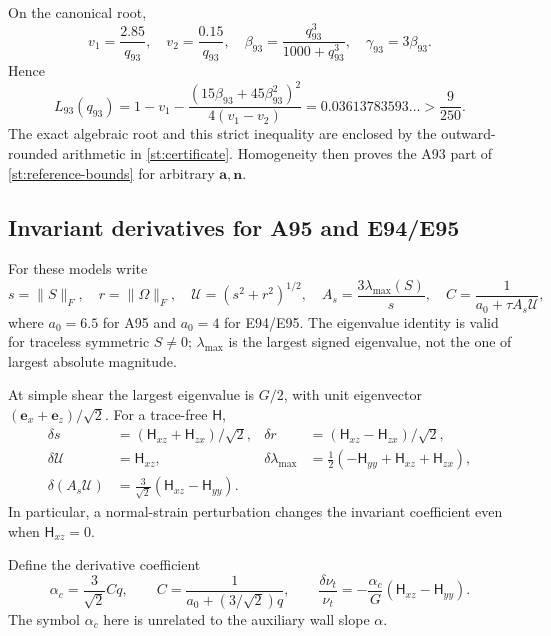 \documentclass[11pt,a4paper]{article}
\numberwithin{equation}{section}
\newcommand{\nut}{\nu_t}
\begin{document}
On the canonical root,
\[
 v_1=\frac{2.85}{q_{93}},\quad v_2=\frac{0.15}{q_{93}},\quad
 \beta_{93}=\frac{q_{93}^3}{1000+q_{93}^3},\quad
 \gamma_{93}=3\beta_{93}.
\]
Hence
\begin{equation}
 L_{93}(q_{93})
 =1-v_1-\frac{(15\beta_{93}+45\beta_{93}^2)^2}
                    {4(v_1-v_2)}
 =0.03613783593\ldots>\frac9{250}.
 \label{st:a93-reference-bound}
\end{equation}
The exact algebraic root and this strict inequality are enclosed by
the outward-rounded arithmetic in \cref{st:certificate}. Homogeneity
then proves the A93 part of \cref{st:reference-bounds} for arbitrary
$\boldsymbol a,\boldsymbol n$.

\subsection{Invariant derivatives for A95 and E94/E95}
\label{st:invariant-derivatives}

For these models write
\[
 s=\|S\|_F,\quad r=\|\Omega\|_F,\quad
 \mathcal U=(s^2+r^2)^{1/2},\quad
 A_s=\frac{3\lambda_{\max}(S)}s,\quad
 C=\frac1{a_0+\tau A_s\mathcal U},
\]
where $a_0=6.5$ for A95 and $a_0=4$ for E94/E95.
The eigenvalue identity is valid for traceless symmetric $S\ne0$;
$\lambda_{\max}$ is the largest signed eigenvalue, not the one of
largest absolute magnitude.

At simple shear the largest eigenvalue is $G/2$, with unit
eigenvector $(\boldsymbol e_x+\boldsymbol e_z)/\sqrt2$. For a
trace-free $\mathsf H$,
\begin{equation}
 \begin{aligned}
 \delta s&=(\mathsf H_{xz}+\mathsf H_{zx})/\sqrt2,&
 \delta r&=(\mathsf H_{xz}-\mathsf H_{zx})/\sqrt2,\\
 \delta\mathcal U&=\mathsf H_{xz},&
 \delta\lambda_{\max}
  &=\tfrac12(-\mathsf H_{yy}+\mathsf H_{xz}+\mathsf H_{zx}),\\
 \delta(A_s\mathcal U)&=\frac3{\sqrt2}
                    (\mathsf H_{xz}-\mathsf H_{yy}).
 \end{aligned}
 \label{st:invariant-variations}
\end{equation}
In particular, a normal-strain perturbation changes the invariant
coefficient even when $\mathsf H_{xz}=0$.

Define the derivative coefficient
\begin{equation}
 \alpha_c=\frac3{\sqrt2}Cq,\qquad
 C=\frac1{a_0+(3/\sqrt2)q},\qquad
 \frac{\delta\nut}{\nut}
 =-\frac{\alpha_c}{G}(\mathsf H_{xz}-\mathsf H_{yy}).
 \label{st:viscosity-derivative}
\end{equation}
The symbol $\alpha_c$ here is unrelated to the auxiliary wall slope
$\alpha$.
\end{document}
